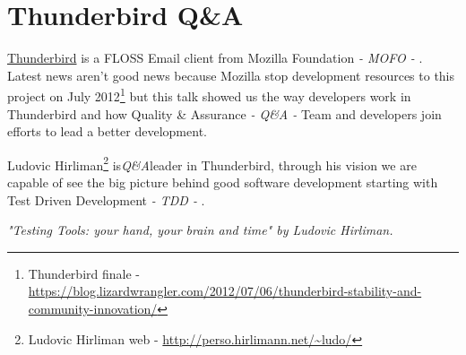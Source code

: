 \section{Thunderbird Q\&A}
\label{sec:thunderbird-qa}

\par \href{http://www.mozilla.org/es-ES/thunderbird/}{Thunderbird} is a FLOSS Email client from Mozilla Foundation \textit{- MOFO -} . Latest news aren't good news because Mozilla stop development resources to this project on July 2012\footnote{Thunderbird finale - \url{https://blog.lizardwrangler.com/2012/07/06/thunderbird-stability-and-community-innovation/}} but this talk showed us the way developers work in Thunderbird and how Quality \& Assurance \textit{- Q\&A -} Team and developers join efforts to lead a better development.

\par Ludovic Hirliman\footnote{Ludovic Hirliman web - \url{http://perso.hirlimann.net/~ludo/}} is\textit{Q\&A}leader in Thunderbird, through his vision we are capable of see the big picture behind good software development starting with Test Driven Development \textit{- TDD -} .

\begin{center}
    \textit{"Testing Tools: your hand, your brain and time" by Ludovic Hirliman.}
\end{center}

